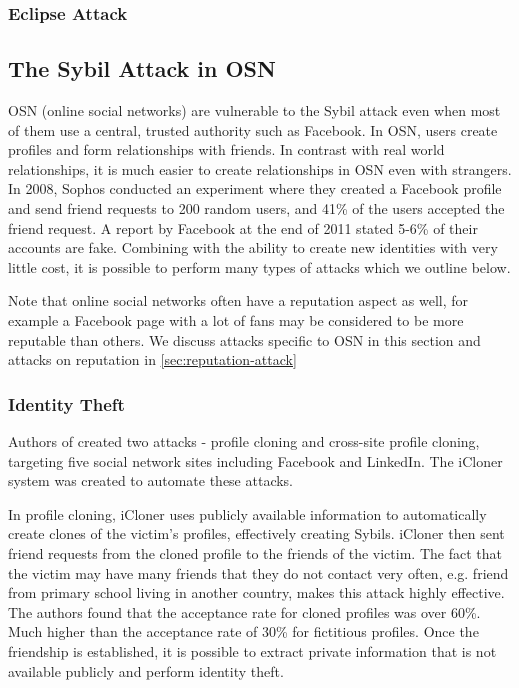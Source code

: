 

\subsubsection{Eclipse Attack}


\subsection{The Sybil Attack in OSN}
OSN (online social networks) are vulnerable to the Sybil attack even when most
of them use a central, trusted authority such as Facebook. In OSN, users create
profiles and form relationships with friends. In contrast with real world
relationships, it is much easier to create relationships in OSN even with
strangers. In 2008, Sophos conducted an experiment where they created a Facebook
profile and send friend requests to 200 random users, and 41\% of the users
accepted the friend request\cite{sophos}. A report by Facebook at the end of
2011 stated 5-6\% of their accounts are fake\cite{facebookfake}. Combining with
the ability to create new identities with very little cost, it is possible to
perform many types of attacks which we outline below.

Note that online social networks often have a reputation aspect as well, for
example a Facebook page with a lot of fans may be considered to be more
reputable than others. We discuss attacks specific to OSN in this section and
attacks on reputation in \autoref{sec:reputation-attack}

\subsubsection{Identity Theft}
Authors of \cite{bilge2009all} created two attacks - profile cloning and
cross-site profile cloning, targeting five social network sites including
Facebook and LinkedIn. The iCloner system was created to automate these
attacks.

In profile cloning, iCloner uses publicly available information to automatically
create clones of the victim's profiles, effectively creating Sybils. iCloner
then sent friend requests from the cloned profile to the friends of the victim.
The fact that the victim may have many friends that they do not contact very
often, e.g. friend from primary school living in another country, makes this
attack highly effective. The authors found that the acceptance rate for cloned
profiles was over 60\%. Much higher than the acceptance rate of 30\% for
fictitious profiles. Once the friendship is established, it is possible to
extract private information that is not available publicly and perform identity
theft.

